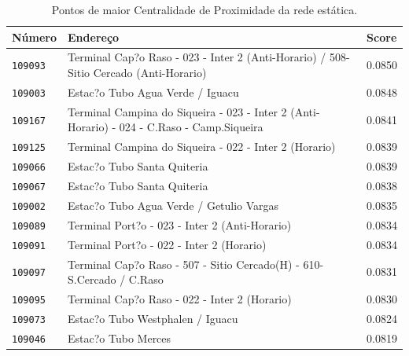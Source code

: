 \begin{table}[htb]
    \caption{Pontos de maior Centralidade de Proximidade da rede estática.}
    \label{tab:centralidade-grau-rede-estatica}
    \centering
    \footnotesize
    \begin{tabular}{p{1.0cm}p{9.0cm}p{3.0cm} } 
        \hline
        Número & Endereço & Score \\
        \hline
            \texttt{109093} &          Terminal Cap?o Raso - 023 - Inter 2 (Anti-Horario) / 508-Sitio Cercado (Anti-Horario)  & 0.0850 \\
           \texttt{109003} &                                                               Estac?o Tubo Agua Verde / Iguacu  & 0.0848 \\
           \texttt{109167} &     Terminal Campina do Siqueira - 023 - Inter 2 (Anti-Horario) - 024 - C.Raso - Camp.Siqueira  & 0.0841 \\
           \texttt{109125} &                                         Terminal Campina do Siqueira - 022 - Inter 2 (Horario)  & 0.0839 \\
           \texttt{109066} &                                                                    Estac?o Tubo Santa Quiteria  & 0.0839 \\
           \texttt{109067} &                                                                    Estac?o Tubo Santa Quiteria  & 0.0838 \\
           \texttt{109002} &                                                       Estac?o Tubo Agua Verde / Getulio Vargas  & 0.0835 \\
           \texttt{109089} &                                                 Terminal Port?o - 023 - Inter 2 (Anti-Horario)  & 0.0834 \\
           \texttt{109091} &                                                      Terminal Port?o - 022 - Inter 2 (Horario)  & 0.0834 \\
           \texttt{109097} &                          Terminal Cap?o Raso - 507 - Sitio Cercado(H) - 610-S.Cercado / C.Raso  & 0.0831 \\
           \texttt{109095} &                                                  Terminal Cap?o Raso - 022 - Inter 2 (Horario)  & 0.0830 \\
           \texttt{109073} &                                                               Estac?o Tubo Westphalen / Iguacu  & 0.0824 \\
           \texttt{109046} &                                                                            Estac?o Tubo Merces  & 0.0819 \\

\end{tabular}
\end{table}
